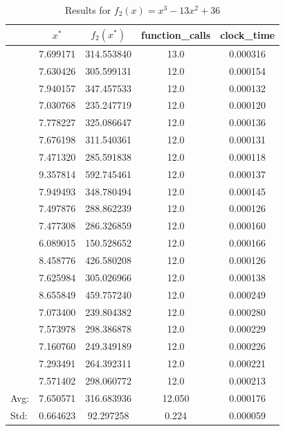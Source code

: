 \documentclass[11pt,onside]{article}
\begin{document}
\begin{description}
\begin {table}[H]
\centering
\caption {Results for $f_{2}(x) = x^3 - 13x^2 + 36$}
\begin{tabular}{lcccc}
\toprule
{} &      $x^*$ &    $f_{2}(x^*)$ &  function\_calls &  clock\_time \\
\midrule
  &  7.699171 &  314.553840 &            13.0 &    0.000316 \\
  &  7.630426 &  305.599131 &            12.0 &    0.000154 \\
  &  7.940157 &  347.457533 &            12.0 &    0.000132 \\
  &  7.030768 &  235.247719 &            12.0 &    0.000120 \\
  &  7.778227 &  325.086647 &            12.0 &    0.000136 \\
  &  7.676198 &  311.540361 &            12.0 &    0.000131 \\
  &  7.471320 &  285.591838 &            12.0 &    0.000118 \\
  &  9.357814 &  592.745461 &            12.0 &    0.000137 \\
  &  7.949493 &  348.780494 &            12.0 &    0.000145 \\
  &  7.497876 &  288.862239 &            12.0 &    0.000126 \\
  &  7.477308 &  286.326859 &            12.0 &    0.000160 \\
  &  6.089015 &  150.528652 &            12.0 &    0.000166 \\
  &  8.458776 &  426.580208 &            12.0 &    0.000126 \\
  &  7.625984 &  305.026966 &            12.0 &    0.000138 \\
  &  8.655849 &  459.757240 &            12.0 &    0.000249 \\
  &  7.073400 &  239.804382 &            12.0 &    0.000280 \\
  &  7.573978 &  298.386878 &            12.0 &    0.000229 \\
  &  7.160760 &  249.349189 &            12.0 &    0.000226 \\
  &  7.293491 &  264.392311 &            12.0 &    0.000221 \\
  &  7.571402 &  298.060772 &            12.0 &    0.000213 \\
\bottomrule
Avg: & 7.650571 & 316.683936 & 12.050 & 0.000176 \\
Std:  & 0.664623 & 92.297258 & 0.224 & 0.000059\\
\bottomrule
\end{tabular}
\end {table}





\end{description}
\end{document}
